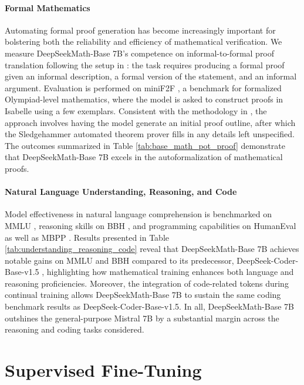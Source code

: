 \paragraph{Formal Mathematics}

Automating formal proof generation has become increasingly important for bolstering both the reliability and efficiency of mathematical verification. We measure DeepSeekMath-Base 7B's competence on informal-to-formal proof translation following the setup in \citep{dsp_proof}: the task requires producing a formal proof given an informal description, a formal version of the statement, and an informal argument. Evaluation is performed on miniF2F \citep{minif2f}, a benchmark for formalized Olympiad-level mathematics, where the model is asked to construct proofs in Isabelle using a few exemplars. Consistent with the methodology in \cite{dsp_proof}, the approach involves having the model generate an initial proof outline, after which the Sledgehammer automated theorem prover \citep{sledgehammer} fills in any details left unspecified. The outcomes summarized in Table \ref{tab:base_math_pot_proof} demonstrate that DeepSeekMath-Base 7B excels in the autoformalization of mathematical proofs.

\paragraph{Natural Language Understanding, Reasoning, and Code}

Model effectiveness in natural language comprehension is benchmarked on MMLU \citep{mmlu}, reasoning skills on BBH \citep{bbh}, and programming capabilities on HumanEval \citep{codex} as well as MBPP \citep{mbpp}. Results presented in Table \ref{tab:understanding_reasoning_code} reveal that DeepSeekMath-Base 7B achieves notable gains on MMLU and BBH compared to its predecessor, DeepSeek-Coder-Base-v1.5 \citep{deepseek-coder}, highlighting how mathematical training enhances both language and reasoning proficiencies. Moreover, the integration of code-related tokens during continual training allows DeepSeekMath-Base 7B to sustain the same coding benchmark results as DeepSeek-Coder-Base-v1.5. In all, DeepSeekMath-Base 7B outshines the general-purpose Mistral 7B \citep{mistral} by a substantial margin across the reasoning and coding tasks considered.

\section{Supervised Fine-Tuning}

